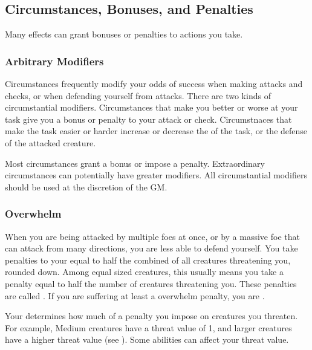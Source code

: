     \subsection{Circumstances, Bonuses, and Penalties}

        Many effects can grant bonuses or penalties to actions you take.

        \subsubsection{Arbitrary Modifiers}

            Circumstances frequently modify your odds of success when making attacks and checks, or when defending yourself from attacks.
            There are two kinds of circumstantial modifiers.
            Circumstances that make you better or worse at your task give you a bonus or penalty to your attack or check.
            Circumstnaces that make the task easier or harder increase or decrease the  of the task, or the defense of the attacked creature.

            Most circumstances grant a  bonus or impose a  penalty.
            Extraordinary circumstances can potentially have greater modifiers.
            All circumstantial modifiers should be used at the discretion of the GM.\@

        \subsubsection{Overwhelm}\label{Overwhelm}
            When you are being attacked by multiple foes at once, or by a massive foe that can attack from many directions, you are less able to defend yourself.
            You take penalties to your  equal to half the combined  of all creatures threatening you, rounded down.
            Among equal sized creatures, this usually means you take a penalty equal to half the number of creatures threatening you.
            These penalties are called .
            If you are suffering at least a  overwhelm penalty, you are .

            \label{Threat Value} Your  determines how much of a penalty you impose on creatures you threaten.
            For example, Medium creatures have a threat value of 1, and larger creatures have a higher threat value (see ).
            Some abilities can affect your threat value.

